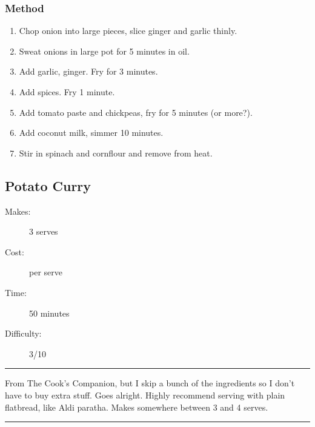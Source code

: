 \documentclass[]{article}
\begin{document}
\subsubsection*{\Large Method}
\begin{enumerate}[font=\huge\color{accent}]
	\item Chop onion into large pieces, slice ginger and garlic thinly.
	\item Sweat onions in large pot for 5 minutes in oil.
	\item Add garlic, ginger. Fry for 3 minutes.
	\item Add spices. Fry 1 minute.
	\item Add tomato paste and chickpeas, fry for 5 minutes (or more?).
	\item Add coconut milk, simmer 10 minutes.
	\item Stir in spinach and cornflour and remove from heat.
\end{enumerate}
\newpage
{}\label{rec:Potato Curry}
\subsection*{\center\huge Potato Curry}
\begin{description}
\item[Makes:] 3 serves
\item[Cost:]  per serve
\item[Time:] 50 minutes
\item[Difficulty:] 3/10
\end{description}
\vspace{0.2cm}\hrule\vspace{0.5cm}
\begin{adjustwidth}{0.5 cm}{0.5 cm}

From The Cook's Companion, but I skip a bunch of the ingredients so I don't have to buy extra stuff. Goes alright. Highly recommend serving with plain flatbread, like Aldi paratha. Makes somewhere between 3 and 4 serves. \hfill{}\color{black}

\end{adjustwidth}
\vspace{0.5cm}\hrule
\end{document}
